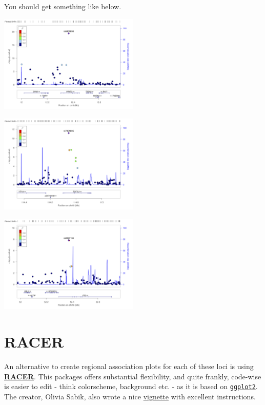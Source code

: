 \documentclass[
]{book}
\newcommand{\passthrough}[1]{#1}
\begin{document}
You should get something like below.

\includegraphics[width=0.5\textwidth,height=\textheight]{./img/_gwas/CEU.rs6802898.400kb.png}

\includegraphics[width=0.5\textwidth,height=\textheight]{./img/_gwas/CEU.rs7901695.400kb.png}

\includegraphics[width=0.5\textwidth,height=\textheight]{./img/_gwas/CEU.rs8050136.400kb.png}

\hypertarget{racer}{%
\section{RACER}\label{racer}}

An alternative to create regional association plots for each of these loci is using \href{https://github.com/oliviasabik/RACER}{\textbf{RACER}}. This packages offers substantial flexibility, and quite frankly, code-wise is easier to edit - think colorscheme, background etc. - as it is based on \href{https://ggplot2.tidyverse.org}{\passthrough{\lstinline!ggplot2!}}. The creator, Olivia Sabik, also wrote a nice \href{https://oliviasabik.github.io/RACERweb/index.html}{vignette} with excellent instructions.
\end{document}
